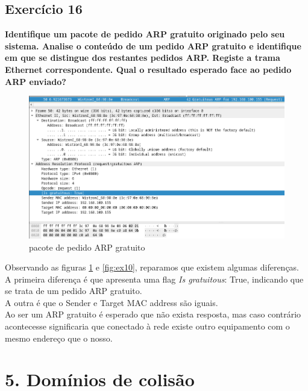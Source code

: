\documentclass[a4paper]{report}
\begin{document}
\section{Exercício 16}
\textbf{Identifique um pacote de pedido ARP gratuito originado pelo seu sistema.
Analise o conteúdo de um pedido ARP gratuito e identifique em que se distingue
dos restantes pedidos ARP. Registe a trama Ethernet correspondente. Qual o
resultado esperado face ao pedido ARP enviado?}

\begin{figure}[H]
    \centering 
    \includegraphics[width=\textwidth]{images/ex16.png}
    \caption{pacote de pedido ARP gratuito}
    \label{fig:ex16}
\end{figure}
Observando as figuras \ref{fig:ex16} e \ref{fig:ex10}, reparamos que existem
algumas diferenças.\\
A primeira diferença é que apresenta uma flag \textit{Is gratuitous}: True,
indicando que se trata de um pedido ARP gratuito.\\
A outra é que o Sender e Target MAC address são iguais.\\
Ao ser um ARP gratuito é esperado que não exista resposta, mas caso contrário
acontecesse significaria que conectado à rede existe outro equipamento com o
mesmo endereço que o nosso.

\chapter{5. Domínios de colisão}
\end{document}
